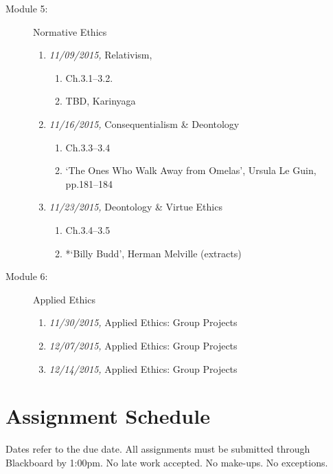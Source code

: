 \documentclass[11pt,article,oneside]{memoir}
\begin{document}
\begin{description}
\begin{enumerate}
\end{enumerate}

\item[Module 5:] Normative Ethics
\begin{enumerate}

\item \textit{11/09/2015,} Relativism, 
\begin{enumerate}
\item Ch.3.1--3.2.
\item TBD, Karinyaga
\end{enumerate}
\item \textit{11/16/2015,} Consequentialism \& Deontology 
\begin{enumerate}
\item Ch.3.3--3.4
\item  `The Ones Who Walk Away from Omelas', Ursula Le Guin, pp.181--184 
\end{enumerate}
\item \textit{11/23/2015,} Deontology \& Virtue Ethics
\begin{enumerate}
\item Ch.3.4--3.5
\item *`Billy Budd', Herman Melville (extracts)
\end{enumerate}

\end{enumerate}

\item[Module 6:] Applied Ethics
\begin{enumerate}
\item \textit{11/30/2015,} Applied Ethics: Group Projects
\item \textit{12/07/2015,} Applied Ethics: Group Projects
\item \textit{12/14/2015,} Applied Ethics: Group Projects
\end{enumerate}

\end{description}





\section{Assignment Schedule}
Dates refer to the due date. All assignments must be submitted through Blackboard by 1:00pm. No late work accepted. No make-ups. No exceptions. 
\end{document}
